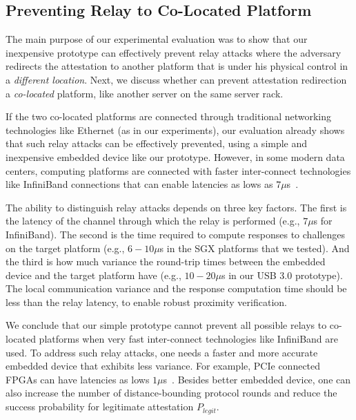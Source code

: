 \subsection{Preventing Relay to Co-Located Platform}
\label{sec:co-located}

The main purpose of our experimental evaluation was to show that our inexpensive \name prototype can effectively prevent relay attacks where the adversary redirects the attestation to another platform that is under his physical control in a \emph{different location}. Next, we discuss whether \name can prevent attestation redirection a \emph{co-located} platform, like another server on the same server rack.

If the two co-located platforms are connected through traditional networking technologies like Ethernet (as in our experiments), our evaluation already shows that such relay attacks can be effectively prevented, using a simple and inexpensive embedded device like our prototype. However, in some modern data centers, computing platforms are connected with faster inter-connect technologies like InfiniBand connections that can enable latencies as lows as $7 \mu$s~\cite{liu2003performance}. 

The ability to distinguish relay attacks depends on three key factors. The first is the latency of the channel through which the relay is performed (e.g., $7 \mu$s for InfiniBand). The second is the time required to compute responses to challenges on the target platform (e.g., $6-10 \mu$s in the SGX platforms that we tested). And the third is how much variance the round-trip times between the embedded device and the target platform have (e.g., $10-20 \mu$s in our USB 3.0 prototype). The local communication variance and the response computation time should be less than the relay latency, to enable robust proximity verification. 

We conclude that our simple prototype cannot prevent all possible relays to co-located platforms when very fast inter-connect technologies like InfiniBand are used. To address such relay attacks, one needs a faster and more accurate embedded device that exhibits less variance. For example, PCIe connected FPGAs can have latencies as lows $1 \mu $s~\cite{algoLogic}. Besides better embedded device, one can also increase the number of distance-bounding protocol rounds and reduce the success probability for legitimate attestation $P_{legit}$.


